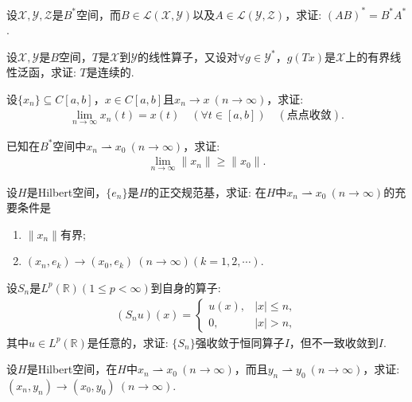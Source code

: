 \documentclass[../../main.tex]{subfiles}%
\begin{document}
\begin{example}
设$\mathscr{X},\mathscr{Y},\mathscr{Z}$是$B^*$空间，而$B\in\mathscr{L}(\mathscr{X},\mathscr{Y})$以及$A\in\mathscr{L}(\mathscr{Y},\mathscr{Z})$，求证: $(AB)^*=B^*A^*$.
\end{example}

\begin{example}
设$\mathscr{X},\mathscr{Y}$是$B$空间，$T$是$\mathscr{X}$到$\mathscr{Y}$的线性算子，又设对$\forall g\in\mathscr{Y}^*$，$g(Tx)$是$\mathscr{X}$上的有界线性泛函，求证: $T$是连续的.
\end{example}

\begin{example}
设$\{x_n\}\subseteq C[a,b]$，$x\in C[a,b]$且$x_n\to x\ (n\to\infty)$，求证:
\begin{align*}
\lim\limits_{n\to\infty}x_n(t)=x(t)\quad(\forall t\in[a,b])\quad(\text{点点收敛}).
\end{align*}
\end{example}

\begin{example}
已知在$B^*$空间中$x_n\rightharpoonup x_0\ (n\to\infty)$，求证:
\begin{align*}
\lim\limits_{n\to\infty}\|x_n\|\geqslant\|x_0\|.
\end{align*}
\end{example}

\begin{example}
设$H$是Hilbert空间，$\{e_n\}$是$H$的正交规范基，求证: 在$H$中$x_n\rightharpoonup x_0\ (n\to\infty)$的充要条件是
\begin{enumerate}[(1)]
\item $\|x_n\|$有界;
\item $(x_n,e_k)\to(x_0,e_k)\ (n\to\infty)(k=1,2,\cdots)$.
\end{enumerate}
\end{example}

\begin{example}
设$S_n$是$L^p(\mathbb{R})(1\leqslant p<\infty)$到自身的算子:
\begin{align*}
(S_nu)(x)=
\begin{cases}
u(x),&|x|\leqslant n,\\
0,&|x|>n,
\end{cases}
\end{align*}
其中$u\in L^p(\mathbb{R})$是任意的，求证: $\{S_n\}$强收敛于恒同算子$I$，但不一致收敛到$I$.
\end{example}

\begin{example}
设$H$是Hilbert空间，在$H$中$x_n\rightharpoonup x_0\ (n\to\infty)$，而且$y_n\rightharpoonup y_0\ (n\to\infty)$，求证: $(x_n,y_n)\to(x_0,y_0)\ (n\to\infty)$.
\end{example}
\end{document}
